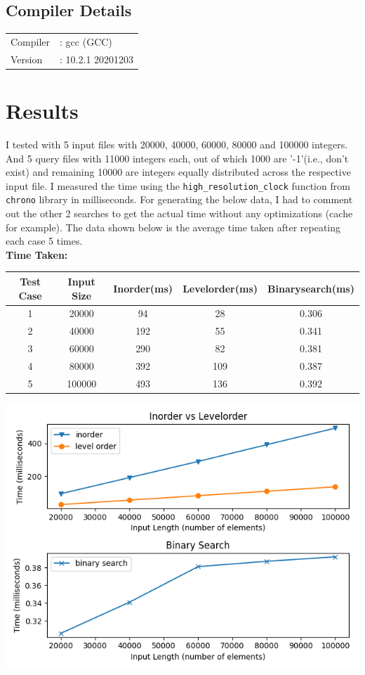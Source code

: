 \documentclass[12pt, letterpaper]{article}
\begin{document}
\subsection{Compiler Details}
\label{sec:compiler}

\begin{tabular}{ll}
  Compiler &: gcc (GCC)\\
  Version  &: 10.2.1 20201203\\
\end{tabular}

\section{Results}
\label{sec:results}

I tested with 5 input files with 20000, 40000, 60000, 80000 and 100000 integers. And 5 query files with 11000 integers each, out of which 1000 are '-1'(i.e., don't exist) and remaining 10000 are integers equally distributed across the respective input file. I measured the time using the \verb~high_resolution_clock~ function from \verb~chrono~ library in milliseconds. For generating the below data, I had to comment out the other 2 searches to get the actual time without any optimizations (cache for example). The data shown below is the average time taken after repeating each case 5 times.\\

\textbf{Time Taken:}\\

\begin{tabular}{ |c|c|c|c|c| }
 \hline
 Test Case &Input Size &Inorder(ms) &Levelorder(ms) &Binarysearch(ms) \\
 \hline
 1         &20000      &94      &28         &0.306        \\
 2         &40000      &192     &55         &0.341        \\
 3         &60000      &290     &82         &0.381        \\
 4         &80000      &392     &109        &0.387        \\
 5         &100000     &493     &136        &0.392        \\
 \hline
\end{tabular}

\includegraphics{1}
\end{document}
